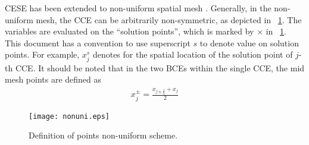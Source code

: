 \documentclass{turgon}
\begin{document}
CESE has been extended to non-uniform spatial mesh
\citep{chang_multi-dimensional_2003}.  Generally, in the non-uniform mesh, the
CCE can be arbitrarily non-symmetric, as depicted in
\figurename~\ref{f:nonuni}.  The variables are evaluated on the ``solution
points'', which is marked by $\times$ in \figurename~\ref{f:nonuni}.  This
document has a convention to use superscript $s$ to denote value on solution
points.  For example, $x_j^s$ denotes for the spatial location of the solution
point of $j$-th CCE.  It should be noted that in the two BCEs within the single
CCE, the mid mesh points are defined as
\begin{align*}
  x_j^{\pm} = \frac{x_{j\pm\frac{1}{2}} + x_j}{2}
\end{align*}

\begin{figure}[htbp]
  \centering
  \texttt{[image: nonuni.eps]}
  \caption{Definition of points non-uniform scheme.}
  \label{f:nonuni}
\end{figure}
\end{document}

